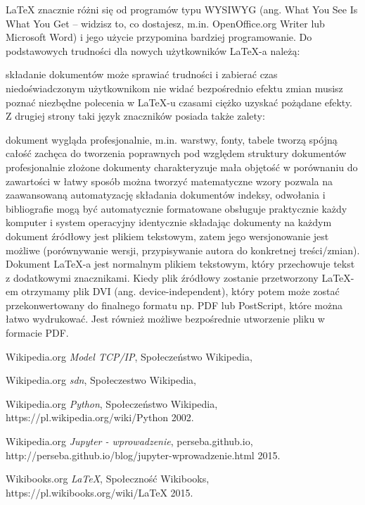 \documentclass{article}
\begin{document}
LaTeX znacznie różni się od programów typu WYSIWYG (ang. What You See Is What You Get – widzisz to, co dostajesz, m.in. OpenOffice.org Writer lub Microsoft Word) i jego użycie przypomina bardziej programowanie. Do podstawowych trudności dla nowych użytkowników LaTeX-a należą:

składanie dokumentów może sprawiać trudności i zabierać czas niedoświadczonym użytkownikom
nie widać bezpośrednio efektu zmian
musisz poznać niezbędne polecenia w LaTeX-u
czasami ciężko uzyskać pożądane efekty.
Z drugiej strony taki język znaczników posiada także zalety:

dokument wygląda profesjonalnie, m.in. warstwy, fonty, tabele tworzą spójną całość
zachęca do tworzenia poprawnych pod względem struktury dokumentów
profesjonalnie złożone dokumenty charakteryzuje mała objętość w porównaniu do zawartości
w łatwy sposób można tworzyć matematyczne wzory
pozwala na zaawansowaną automatyzację składania dokumentów
indeksy, odwołania i bibliografie mogą być automatycznie formatowane
obsługuje praktycznie każdy komputer i system operacyjny identycznie składając dokumenty na każdym
dokument źródłowy jest plikiem tekstowym, zatem jego wersjonowanie jest możliwe (porównywanie wersji, przypisywanie autora do konkretnej treści/zmian).
Dokument LaTeX-a jest normalnym plikiem tekstowym, który przechowuje tekst z dodatkowymi znacznikami. Kiedy plik źródłowy zostanie przetworzony LaTeX-em otrzymamy plik DVI (ang. device-independent), który potem może zostać przekonwertowany do finalnego formatu np. PDF lub PostScript, które można łatwo wydrukować. Jest również możliwe bezpośrednie utworzenie pliku w formacie PDF.
\newpage

  \begin{thebibliography}{9}

  Wikipedia.org
  \textit{Model TCP/IP},
  Społeczeństwo Wikipedia,
 
  Wikipedia.org
  \textit{ sdn},
  Społeczestwo Wikipedia,
  
  Wikipedia.org
  \textit{ Python},
  Społeczeństwo Wikipedia,
  https://pl.wikipedia.org/wiki/Python
  2002.

  Wikipedia.org
  \textit{Jupyter - wprowadzenie},
  perseba.github.io,
  http://perseba.github.io/blog/jupyter-wprowadzenie.html
  2015.

  Wikibooks.org
  \textit{LaTeX},
  Społeczność Wikibooks,
  https://pl.wikibooks.org/wiki/LaTeX
  2015.


  


\end{thebibliography}
\end{document}
